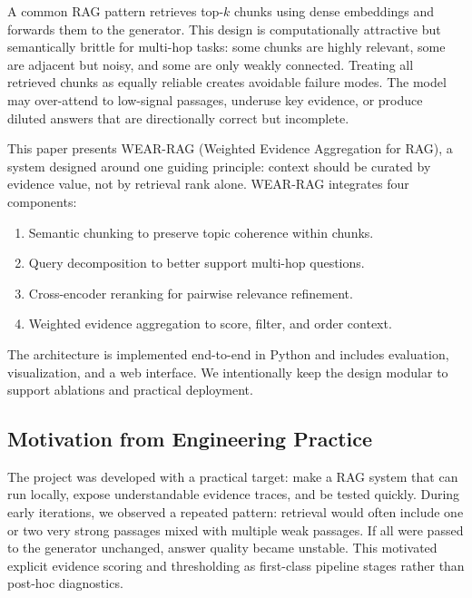 \documentclass[10pt,draftclsnofoot,onecolumn,journal]{IEEEtran}
\begin{document}
A common RAG pattern retrieves top-$k$ chunks using dense embeddings and forwards them to the generator. This design is computationally attractive but semantically brittle for multi-hop tasks: some chunks are highly relevant, some are adjacent but noisy, and some are only weakly connected. Treating all retrieved chunks as equally reliable creates avoidable failure modes. The model may over-attend to low-signal passages, underuse key evidence, or produce diluted answers that are directionally correct but incomplete.

This paper presents WEAR-RAG (Weighted Evidence Aggregation for RAG), a system designed around one guiding principle: context should be curated by evidence value, not by retrieval rank alone. WEAR-RAG integrates four components:
\begin{enumerate}
\item Semantic chunking to preserve topic coherence within chunks.
\item Query decomposition to better support multi-hop questions.
\item Cross-encoder reranking for pairwise relevance refinement.
\item Weighted evidence aggregation to score, filter, and order context.
\end{enumerate}

The architecture is implemented end-to-end in Python and includes evaluation, visualization, and a web interface. We intentionally keep the design modular to support ablations and practical deployment.

\subsection{Motivation from Engineering Practice}
The project was developed with a practical target: make a RAG system that can run locally, expose understandable evidence traces, and be tested quickly. During early iterations, we observed a repeated pattern: retrieval would often include one or two very strong passages mixed with multiple weak passages. If all were passed to the generator unchanged, answer quality became unstable. This motivated explicit evidence scoring and thresholding as first-class pipeline stages rather than post-hoc diagnostics.
\end{document}
